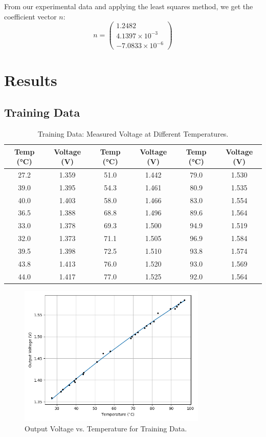 \documentclass{article}
\begin{document}
	From our experimental data and applying the least squares method, we get the coefficient vector \(n\):
	\[ n = \begin{pmatrix} 1.2482 \\ 4.1397 \times 10^{-3} \\ -7.0833 \times 10^{-6} \end{pmatrix} \]
	
	\section{Results}
	
	\subsection{Training Data}
	\begin{table}[H]
		\centering
		\caption{Training Data: Measured Voltage at Different Temperatures.}
		\label{tab:trainingdata}
		\begin{tabular}{cc|cc|cc}
			\toprule
			\textbf{Temp (°C)} & \textbf{Voltage (V)} & \textbf{Temp (°C)} & \textbf{Voltage (V)} & \textbf{Temp (°C)} & \textbf{Voltage (V)} \\
			\midrule
			27.2 & 1.359 & 51.0 & 1.442 & 79.0 & 1.530 \\
			39.0 & 1.395 & 54.3 & 1.461 & 80.9 & 1.535 \\
			40.0 & 1.403 & 58.0 & 1.466 & 83.0 & 1.554 \\
			36.5 & 1.388 & 68.8 & 1.496 & 89.6 & 1.564 \\
			33.0 & 1.378 & 69.3 & 1.500 & 94.9 & 1.519 \\
			32.0 & 1.373 & 71.1 & 1.505 & 96.9 & 1.584 \\
			39.5 & 1.398 & 72.5 & 1.510 & 93.8 & 1.574 \\
			43.8 & 1.413 & 76.0 & 1.520 & 93.0 & 1.569 \\
			44.0 & 1.417 & 77.0 & 1.525 & 92.0 & 1.564 \\
			\bottomrule
		\end{tabular}
	\end{table}
	
\begin{figure}[H]
	\centering
	\includegraphics[width=0.8\textwidth]{figs/train}
	\caption{Output Voltage vs. Temperature for Training Data.}
	\label{fig:train}
\end{figure}
	
\end{document}
